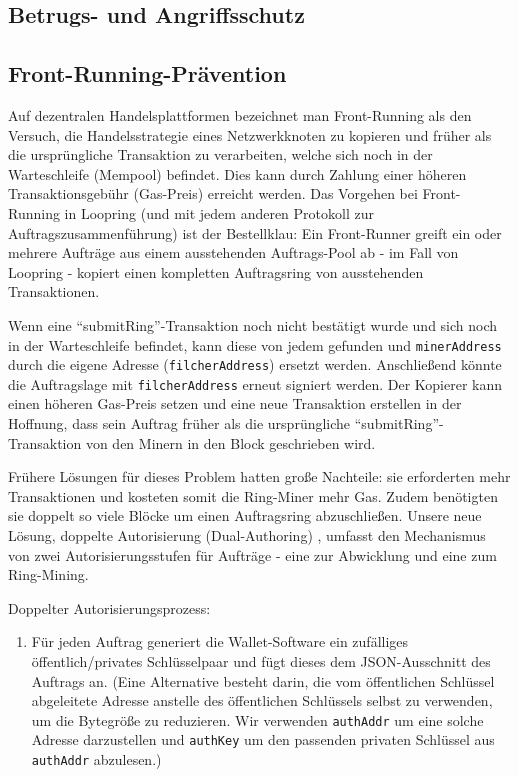 \documentclass[UTF8,nofonts]{article}
\begin{document}
\begin{multicols}{2}
\section{Betrugs- und Angriffsschutz}

\subsection{Front-Running-Prävention\label{sec:dual_authoring}}

Auf dezentralen Handelsplattformen bezeichnet man Front-Running als den Versuch, die Handelsstrategie eines Netzwerkknoten zu kopieren und früher als die ursprüngliche Transaktion zu verarbeiten, welche sich noch in der Warteschleife (Mempool) befindet. Dies kann durch Zahlung einer höheren Transaktionsgebühr (Gas-Preis) erreicht werden. Das Vorgehen bei Front-Running in Loopring (und mit jedem anderen Protokoll zur Auftragszusammenführung) ist der Bestellklau: Ein Front-Runner greift ein oder mehrere Aufträge aus einem ausstehenden Auftrags-Pool ab - im Fall von Loopring - kopiert einen kompletten Auftragsring von ausstehenden Transaktionen.

Wenn eine \enquote{submitRing}-Transaktion noch nicht bestätigt wurde und sich noch in der Warteschleife befindet, kann diese von jedem gefunden und \verb|minerAddress| durch die eigene Adresse (\verb|filcherAddress|) ersetzt werden. Anschließend könnte die Auftragslage mit \verb|filcherAddress| erneut signiert werden. Der Kopierer kann einen höheren Gas-Preis setzen und eine neue Transaktion erstellen in der Hoffnung, dass sein Auftrag früher als die ursprüngliche \enquote{submitRing}-Transaktion von den Minern in den Block geschrieben wird.

Frühere Lösungen für dieses Problem hatten große Nachteile: sie erforderten mehr Transaktionen und kosteten somit die Ring-Miner mehr Gas. Zudem benötigten sie doppelt so viele Blöcke um einen Auftragsring abzuschließen. Unsere neue Lösung, doppelte Autorisierung (Dual-Authoring) \cite{dualauthor}, umfasst den Mechanismus von zwei Autorisierungsstufen für Aufträge - eine zur Abwicklung und eine zum Ring-Mining.

Doppelter Autorisierungsprozess:

\begin{enumerate}

	\item Für jeden Auftrag generiert die Wallet-Software ein zufälliges öffentlich/privates Schlüsselpaar und fügt dieses dem JSON-Ausschnitt des Auftrags an. (Eine Alternative besteht darin, die vom öffentlichen Schlüssel abgeleitete Adresse anstelle des öffentlichen Schlüssels selbst zu verwenden, um die Bytegröße zu reduzieren. Wir verwenden \verb|authAddr| um eine solche Adresse darzustellen und \verb|authKey| um den passenden privaten Schlüssel aus \verb|authAddr| abzulesen.)


\end{enumerate}
\end{multicols}
\end{document}
